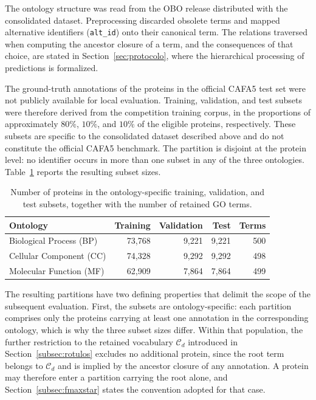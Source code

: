 \documentclass[Ingles]{ic-tese-v3}
\begin{document}
The ontology structure was read from the OBO release distributed with the
consolidated dataset. Preprocessing discarded obsolete terms and mapped
alternative identifiers (\texttt{alt\_id}) onto their canonical term. The
relations traversed when computing the ancestor closure of a term, and the
consequences of that choice, are stated in Section~\ref{sec:protocolo}, where the
hierarchical processing of predictions is formalized.

The ground-truth annotations of the proteins in the official CAFA5 test set were
not publicly available for local evaluation. Training, validation, and test
subsets were therefore derived from the competition training corpus, in the
proportions of approximately $80\%$, $10\%$, and $10\%$ of the eligible proteins,
respectively. These subsets are specific to the consolidated dataset described
above and do not constitute the official CAFA5 benchmark. The partition is
disjoint at the protein level: no identifier occurs in more than one subset in
any of the three ontologies. Table~\ref{tab:cafa5} reports the resulting subset
sizes.

\begin{table}[!htb]
    \centering
    \caption{Number of proteins in the ontology-specific training, validation,
    and test subsets, together with the number of retained GO terms.}
    \label{tab:cafa5}
    \begin{tabular}{lrrrr}
    \toprule
    Ontology & Training & Validation & Test & Terms\\
    \midrule
    Biological Process (BP) & 73,768 & 9,221 & 9,221 & 500\\
    Cellular Component (CC) & 74,328 & 9,292 & 9,292 & 498\\
    Molecular Function (MF) & 62,909 & 7,864 & 7,864 & 499\\
    \bottomrule
    \end{tabular}
\end{table}

The resulting partitions have two defining properties that delimit the scope of
the subsequent evaluation. First, the subsets are ontology-specific: each
partition comprises only the proteins carrying at least one annotation in the
corresponding ontology, which is why the three subset sizes differ. Within that
population, the further restriction to the retained vocabulary $\mathcal{C}_d$
introduced in Section~\ref{subsec:rotulos} excludes no additional protein, since
the root term belongs to $\mathcal{C}_d$ and is implied by the ancestor closure
of any annotation. A protein may therefore enter a partition carrying the root
alone, and Section~\ref{subsec:fmaxstar} states the convention adopted for that
case.
\end{document}
